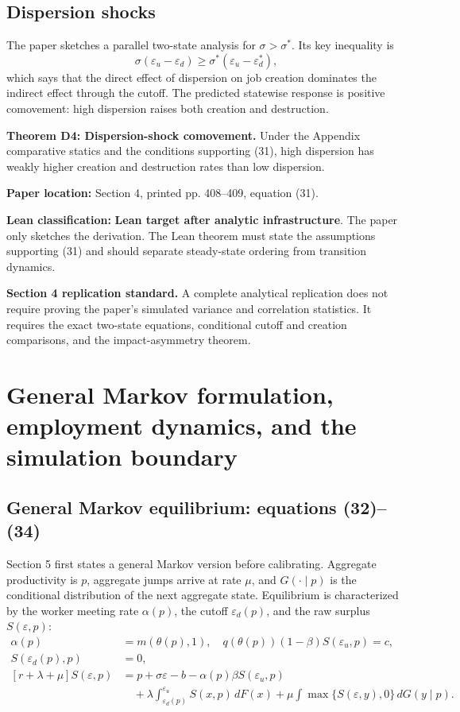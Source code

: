 \documentclass[11pt]{article}
\newcommand{\epsd}{\varepsilon_d}
\newcommand{\epsu}{\varepsilon_u}
\newcommand{\paperloc}[1]{\textbf{Paper location:} #1}
\newcommand{\leanclass}[1]{\textbf{Lean classification:} #1}
\newcommand{\infra}{\textcolor{darkAmber}{\textbf{Lean target after analytic infrastructure}}}
\newcommand{\statusbox}[2]{\vspace{2pt}\noindent\colorbox{#1}{\parbox{0.955\linewidth}{\small #2}}\vspace{2pt}}
\newcommand{\resultname}[1]{\medskip\noindent\textbf{#1.}}
\begin{document}
\subsection{Dispersion shocks}

The paper sketches a parallel two-state analysis for $\sigma>\sigma^*$. Its key inequality is
\begin{equation}
 \sigma(\epsu-\epsd)\ge \sigma^*(\epsu-\epsd^*), \tag{31}
\end{equation}
which says that the direct effect of dispersion on job creation dominates the indirect effect through the cutoff. The predicted statewise response is positive comovement: high dispersion raises both creation and destruction.

\resultname{Theorem D4: Dispersion-shock comovement}
Under the Appendix comparative statics and the conditions supporting (31), high dispersion has weakly higher creation and destruction rates than low dispersion.

\paperloc{Section 4, printed pp. 408--409, equation (31).}

\leanclass{\infra.}
The paper only sketches the derivation. The Lean theorem must state the assumptions supporting (31) and should separate steady-state ordering from transition dynamics.

\statusbox{paleAmber}{\textbf{Section 4 replication standard.} A complete analytical replication does not require proving the paper's simulated variance and correlation statistics. It requires the exact two-state equations, conditional cutoff and creation comparisons, and the impact-asymmetry theorem.}

\newpage
\section{General Markov formulation, employment dynamics, and the simulation boundary}

\subsection{General Markov equilibrium: equations (32)--(34)}

Section 5 first states a general Markov version before calibrating. Aggregate productivity is $p$, aggregate jumps arrive at rate $\mu$, and $G(\cdot\mid p)$ is the conditional distribution of the next aggregate state. Equilibrium is characterized by the worker meeting rate $\alpha(p)$, the cutoff $\epsd(p)$, and the raw surplus $S(\varepsilon,p)$:
\begin{align}
 \alpha(p)&=m(\theta(p),1),
 \quad q(\theta(p))(1-\beta)S(\epsu,p)=c, \tag{32}\\
 S(\epsd(p),p)&=0, \tag{33}\\
 [r+\lambda+\mu]S(\varepsilon,p)
 &=p+\sigma\varepsilon-b-\alpha(p)\beta S(\epsu,p)\\
 &\quad+\lambda\int_{\epsd(p)}^{\epsu}S(x,p)\,dF(x)
 +\mu\int\max\{S(\varepsilon,y),0\}\,dG(y\mid p). \tag{34}
\end{align}
\end{document}
